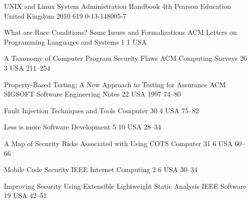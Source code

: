 \begin{thebibliography}{9}
		{
			\biband
			\biband
			\biband
			}
		{{UNIX} and {L}inux System Administration Handbook}
		{4th}
		{Pearson Education}
		{United Kingdom}
		{2010}
		{619}
		{0-13-148005-7}
		

		{
			\biband
			}
		{What are Race Conditions? Some Issues and Formalizations}
		{ACM Letters on Programming Languages and Systems}
		{1}
		{1}
		{USA}
		{}
		{}
	
		{
			\biband
			\biband
			\biband
			}
		{A Taxonomy of Computer Program Security Flaws}
		{ACM Computing Surveys}
		{26}
		{3}
		{USA}
		{}
		{211--254}
		
		{
			\biband
			}
		{Property-Based Testing; A New Approach to Testing for Assurance}
		{ACM SIGSOFT Software Engineering Notes}
		{22}
		{}
		{USA}
		{1997}
		{74--80}
	
		{
			\biband
			\biband
			}
		{Fault Injection Techniques and Tools}
		{Computer}
		{30}
		{4}
		{USA}
		{}
		{75--82}
	
		{}
		{Less is more}
		{Software Development}
		{5}
		{10}
		{USA}
		{}
		{28--34}
	
		{
			\biband
			}
		{A Map of Security Risks Associated with Using {COTS}}
		{Computer}
		{31}
		{6}
		{USA}
		{}
		{60--66}
	
		{
			\biband
			}
		{Mobile Code Security}
		{{IEEE} Internet Computing}
		{2}
		{6}
		{USA}
		{}
		{30--34}
	
		{
			\biband
			}
		{Improving Security Using Extensible Lightweight Static Analysis}
		{{IEEE} Software}
		{19}
		{}
		{USA}
		{}
		{42--51}
	

\end{thebibliography}
